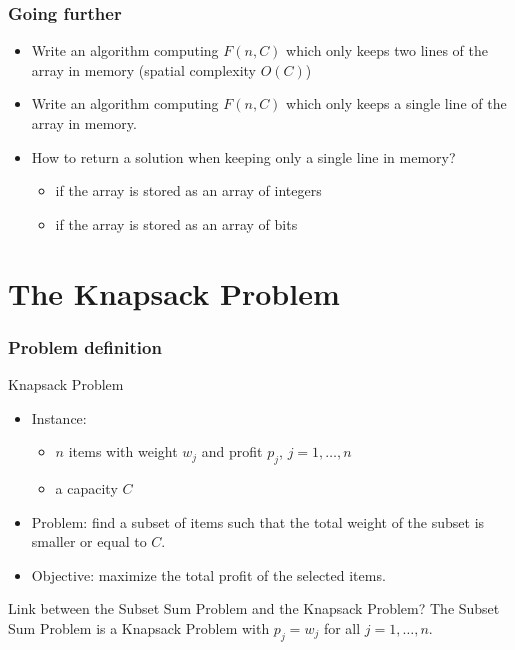 \documentclass{beamer}
\begin{document}
\begin{frame}
  \frametitle{Going further}

  \begin{itemize}
    \item Write an algorithm computing $F(n, C)$ which only keeps two lines of the array in memory (spatial complexity $O(C)$)
    \item Write an algorithm computing $F(n, C)$ which only keeps a single line of the array in memory.
    \item How to return a solution when keeping only a single line in memory?
      \begin{itemize}
        \item if the array is stored as an array of integers
        \item if the array is stored as an array of bits
      \end{itemize}
  \end{itemize}

\end{frame}

\section{The Knapsack Problem}

\begin{frame}
  \frametitle{Problem definition}

  \begin{block}{Knapsack Problem}
    \begin{itemize}
      \item Instance:
        \begin{itemize}
          \item $n$ items with weight \alert{$w_j$} and profit \alert{$p_j$}, $j = 1, \dots, n$
          \item a capacity \alert{$C$}
        \end{itemize}
      \item Problem: find a subset of items such that the total weight of the subset is smaller or equal to $C$.
      \item Objective: maximize the total profit of the selected items.
    \end{itemize}
  \end{block}

  \pause
  Link between the Subset Sum Problem and the Knapsack Problem?
  \pause
  The Subset Sum Problem is a Knapsack Problem with $p_j = w_j$ for all $j = 1, \dots, n$.
\end{frame}
\end{document}
